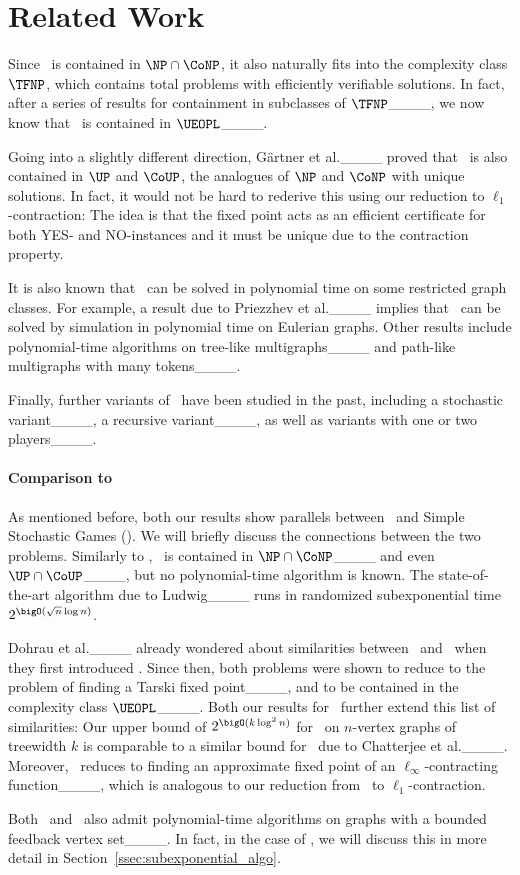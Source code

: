 \section{Related Work}
Since \arrival\ is contained in $\NP \cap \CoNP$, it also naturally fits into the complexity class $\TFNP$, which contains total problems with efficiently verifiable solutions. In fact, after a series of results for containment in subclasses of $\TFNP$____, we now know that \arrival\ is contained in $\UEOPL$____.

Going into a slightly different direction, Gärtner et al.\@____ proved that \arrival\ is also contained in $\UP$ and $\CoUP$, the analogues of $\NP$ and $\CoNP$ with unique solutions. 
In fact, it would not be hard to rederive this using our reduction to $\ell_1$-contraction: The idea is that the fixed point acts as an efficient certificate for both YES- and NO-instances and it must be unique due to the contraction property.

It is also known that \arrival\ can be solved in polynomial time on some restricted graph classes. For example, a result due to Priezzhev et al.\@____ implies that \arrival\ can be solved by simulation in polynomial time on Eulerian graphs. Other results include polynomial-time algorithms on tree-like multigraphs____ and path-like multigraphs with many tokens____. 

Finally, further variants of \arrival\ have been studied in the past, including a stochastic variant____, a recursive variant____, as well as variants with one or two players____.

\paragraph*{Comparison to \ssg\ }

As mentioned before, both our results show parallels between \arrival\ and Simple Stochastic Games (\ssg). We will briefly discuss the connections between the two problems. 
Similarly to \arrival, \ssg\ is contained in $\NP \cap \CoNP$____ and even $\UP \cap \CoUP$____, but no polynomial-time algorithm is known. The state-of-the-art algorithm due to Ludwig____ runs in randomized subexponential time $2^{\bigO(\sqrt{n}\log n)}$.

Dohrau et al.\@____ already wondered about similarities between \arrival\ and \ssg\ when they first introduced \arrival. Since then, both problems were shown to reduce to the problem of finding a Tarski fixed point____, and to be contained in the complexity class $\UEOPL$____. Both our results for \arrival\ further extend this list of similarities: Our upper bound of $2^{\bigO(k \log^2 n)}$ for \arrival\ on $n$-vertex graphs of treewidth $k$ is comparable to a similar bound for \ssg\ due to Chatterjee et al.\@____. Moreover, \ssg\ reduces to finding an approximate fixed point of an $\ell_\infty$-contracting function____, which is analogous to our reduction from \arrival\ to $\ell_1$-contraction. 

Both \arrival\ and \ssg\ also admit polynomial-time algorithms on graphs with a bounded feedback vertex set____. In fact, in the case of \arrival, we will discuss this in more detail in Section~\ref{ssec:subexponential_algo}.